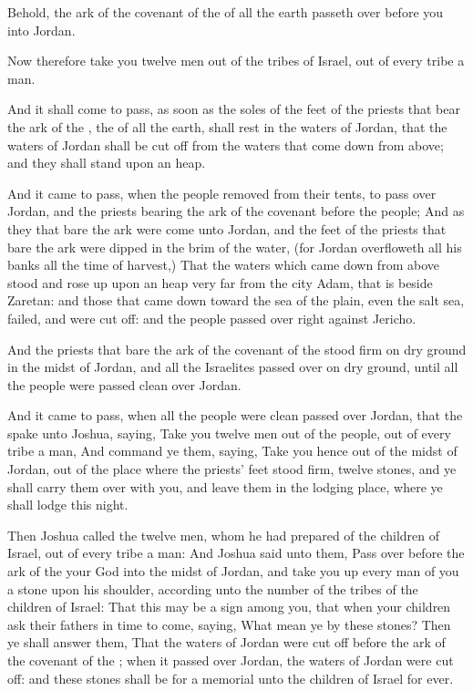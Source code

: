 \Verse Behold, the ark of the covenant of the \LORD of all the earth passeth over before you into Jordan.

\Verse Now therefore take you twelve men out of the tribes of Israel, out of every tribe a man.

\Verse And it shall come to pass, as soon as the soles of the feet of the priests that bear the ark of the \LORD, the \LORD of all the earth, shall rest in the waters of Jordan, that the waters of Jordan shall be cut off from the waters that come down from above; and they shall stand upon an heap.

\Verse And it came to pass, when the people removed from their tents, to pass over Jordan, and the priests bearing the ark of the covenant before the people; \Verse And as they that bare the ark were come unto Jordan, and the feet of the priests that bare the ark were dipped in the brim of the water, (for Jordan overfloweth all his banks all the time of harvest,) \Verse That the waters which came down from above stood and rose up upon an heap very far from the city Adam, that is beside Zaretan: and those that came down toward the sea of the plain, even the salt sea, failed, and were cut off: and the people passed over right against Jericho.

\Verse And the priests that bare the ark of the covenant of the \LORD stood firm on dry ground in the midst of Jordan, and all the Israelites passed over on dry ground, until all the people were passed clean over Jordan.


\Chapter
\Verse And it came to pass, when all the people were clean passed over Jordan, that the \LORD spake unto Joshua, saying, \Verse Take you twelve men out of the people, out of every tribe a man, \Verse And command ye them, saying, Take you hence out of the midst of Jordan, out of the place where the priests' feet stood firm, twelve stones, and ye shall carry them over with you, and leave them in the lodging place, where ye shall lodge this night.

\Verse Then Joshua called the twelve men, whom he had prepared of the children of Israel, out of every tribe a man: \Verse And Joshua said unto them, Pass over before the ark of the \LORD your God into the midst of Jordan, and take you up every man of you a stone upon his shoulder, according unto the number of the tribes of the children of Israel: \Verse That this may be a sign among you, that when your children ask their fathers in time to come, saying, What mean ye by these stones?  \Verse Then ye shall answer them, That the waters of Jordan were cut off before the ark of the covenant of the \LORD; when it passed over Jordan, the waters of Jordan were cut off: and these stones shall be for a memorial unto the children of Israel for ever.

